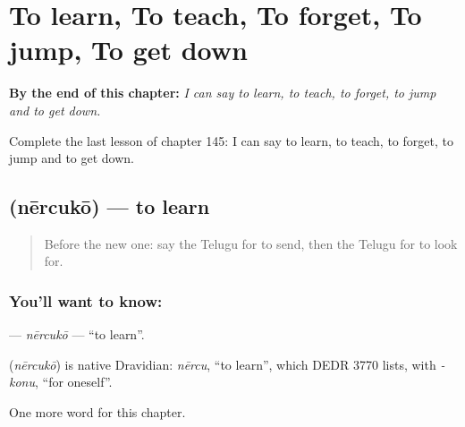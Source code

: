 
\chapter{To learn, To teach, To forget, To jump, To get down}
\label{ch:te-to-learn-to-teach-to-forget-to-jump-to-get-down}

\begin{chapteropening}
\textbf{By the end of this chapter:} \emph{I can say to learn, to teach, to forget, to jump and to get down.}

Complete the last lesson of chapter 145: I can say to learn, to teach, to forget, to jump and to get down.
\end{chapteropening}

\section[\texorpdfstring{\te{నేర్చుకో} (nērcukō)}{నేర్చుకో (nērcukō)}]{ (nērcukō) — to learn}

\label{lesson:TE-C145-nercuko}



\begin{quote}
Before the new one: say the Telugu for to send, then the Telugu for to look for.
\end{quote}

\subsection*{You'll want to know: }
\textbf{} — \emph{nērcukō} — \textquotedblleft{}to learn\textquotedblright{}.

\begin{cousinweb}
\textbf{} (\emph{nērcukō}) is native Dravidian: \emph{nērcu}, \textquotedblleft{}to learn\textquotedblright{}, which DEDR 3770 lists, with \emph{-konu}, \textquotedblleft{}for oneself\textquotedblright{}.
\end{cousinweb}

\begin{grammarlens}[title={What you've built}]
One more word for this chapter.
\end{grammarlens}

